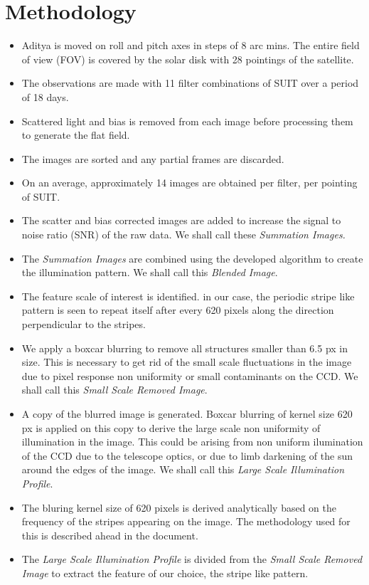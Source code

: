 \documentclass[11pt,a4paper]{article}
\begin{document}
	\section{Methodology}
	\begin{itemize}
		\item Aditya is moved on roll and pitch axes in steps of 8 arc mins. The entire field of view (FOV) is covered by the solar disk with 28 pointings of the satellite.
		\item The observations are made with 11 filter combinations of SUIT over a period of 18 days.
		\item Scattered light and bias is removed from each image before processing them to generate the flat field.
		\item The images are sorted and any partial frames are discarded.
		\item On an average, approximately 14 images are obtained per filter, per pointing of SUIT.
		\item The scatter and bias corrected images are added to increase the signal to noise ratio (SNR) of the raw data. We shall call these \textit{Summation Images.}
		\item The \textit{Summation Images} are combined using the developed algorithm to create the illumination pattern. We shall call this \textit{Blended Image}.
		\item The feature scale of interest is identified. in our case, the periodic stripe like pattern is seen to repeat itself after every 620 pixels along the direction perpendicular to the stripes.
		\item We apply a boxcar blurring to remove all structures smaller than 6.5 px in size. This is necessary to get rid of the small scale fluctuations in the image due to pixel response non uniformity or small contaminants on the CCD. We shall call this \textit{Small Scale Removed Image}.
		\item A copy of the blurred image is generated. Boxcar blurring of kernel size 620 px is applied on this copy to derive the large scale non uniformity of illumination in the image. This could be arising from non uniform ilumination of the CCD due to the telescope optics, or due to limb darkening of the sun around the edges of the image. We shall call this \textit{Large Scale Illumination Profile}.
		\item The bluring kernel size of 620 pixels is derived analytically based on the frequency of the stripes appearing on the image. The methodology used for this is described ahead in the document.
		\item The \textit{Large Scale Illumination Profile} is divided from the \textit{Small Scale Removed Image} to extract the feature of our choice, the stripe like pattern.
		
	\end{itemize}
	
\end{document}
